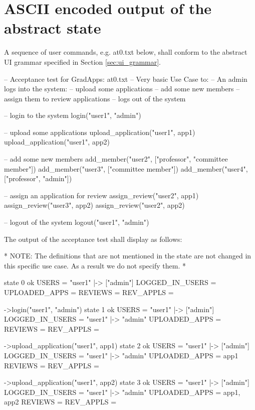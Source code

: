 \documentclass[fontsize=12pt,paper=letter,twoside]{scrartcl}
\begin{document}
\newpage
\section{ASCII encoded output of the abstract state}

A sequence of user commands, e.g. at0.txt below, shall conform to the abstract UI grammar specified in Section \ref{sec:ui_grammar}.\\

\begin{code}
-- Acceptance test for GradApps: at0.txt 
-- Very basic Use Case to:
	-- An admin logs into the system:
		-- upload some applications
		-- add some new members
		-- assign them to review applications
		-- logs out of the system

-- login to the system
login("user1", "admin")

-- upload some applications
upload_application("user1", app1)
upload_application("user1", app2)

-- add some new members
add_member("user2", ["professor", "committee member"])
add_member("user3", ["committee member"])
add_member("user4", ["professor", "admin"])

-- assign an application for review
assign_review("user2", app1)
assign_review("user3", app2)
assign_review("user2", app2)

-- logout of the system
logout("user1", "admin")
\end{code}

\newpage
\noindent The output of the acceptance test shall display as follows:

\begin{code}
  \** NOTE: The definitions that are not mentioned in the state are  
  not changed in this specific use case. As a result we do not 
  specify them. \**
  
  state 0 ok
  USERS = {"user1" |-> ["admin"]}
  LOGGED_IN_USERS = {}
  UPLOADED_APPS = {}
  REVIEWS = {}
  REV_APPLS = {}
  
->login("user1", "admin")
  state 1 ok
  USERS = {"user1" |-> ["admin"]}
  LOGGED_IN_USERS = {"user1" |-> "admin"}
  UPLOADED_APPS = {}
  REVIEWS = {}
  REV_APPLS = {}

->upload_application("user1", app1)
  state 2 ok
  USERS = {"user1" |-> ["admin"]}
  LOGGED_IN_USERS = {"user1" |-> "admin"}
  UPLOADED_APPS = {app1}
  REVIEWS = {}
  REV_APPLS = {}
  
->upload_application("user1", app2)
  state 3 ok
  USERS = {"user1" |-> ["admin"]}
  LOGGED_IN_USERS = {"user1" |-> "admin"}
  UPLOADED_APPS = {app1, app2}
  REVIEWS = {}
  REV_APPLS = {}
\end{code}
\end{document}
